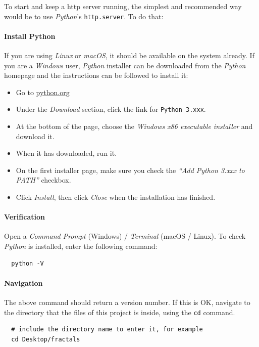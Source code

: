 To start and keep a \gls{http} server running, the simplest and recommended way would be to use \emph{Python}'s \texttt{http.server}. To do that\cite{bib:moz:simplehttp}:

\paragraph{Install Python} If you are using \emph{Linux} or \emph{macOS}, it should be available on the system already. If you are a \emph{Windows} user, \emph{Python} installer can be downloaded from the \emph{Python} homepage and the instructions can be followed to install it:

\begin{itemize}
  \item Go to \url{python.org}
  \item Under the \emph{Download} section, click the link for \texttt{Python 3.xxx}.
  \item At the bottom of the page, choose the \emph{Windows x86 executable installer} and download it.
  \item When it has downloaded, run it.
  \item On the first installer page, make sure you check the \emph{``Add Python 3.xxx to PATH''} checkbox.
  \item Click \emph{Install}, then click \emph{Close} when the installation has finished.
\end{itemize}

\paragraph{Verification}

Open a \emph{Command Prompt} (Windows) / \emph{Terminal} (macOS / Linux). To check \emph{Python} is installed, enter the following command:

\begin{verbatim}
  python -V
\end{verbatim}

\paragraph{Navigation}

The above command should return a version number. If this is OK, navigate to the directory that the files of this project is inside, using the \texttt{cd} command.

\begin{verbatim}
  # include the directory name to enter it, for example
  cd Desktop/fractals
\end{verbatim}

